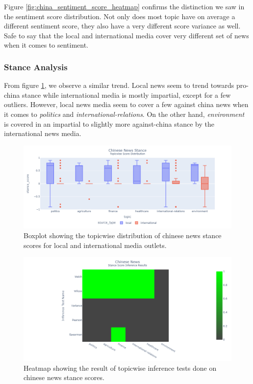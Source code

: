 \documentclass{article}
\theoremstyle{mytheoremstyle}
\theoremstyle{mytheoremstyle}
\theoremstyle{myproblemstyle}
\begin{document}
    Figure \ref{fig:china_sentiment_score_heatmap} confirms the distinction we saw in the sentiment score distribution. Not only does most topic have on average a different sentiment score, they also have a very different score variance as well. Safe to say that the local and international media cover very different set of news when it comes to sentiment.
    
    \subsubsection{Stance Analysis}    

    From figure \ref{fig:china_stance_score_boxplot}, we observe a similar trend. Local news seem to trend towards pro-china stance while international media is mostly impartial, except for a few outliers. However, local news media seem to cover a few against china news when it comes to \emph{politics} and \emph{international-relations}. On the other hand, \emph{environment} is covered in an impartial to slightly more against-china stance by the international news media.
    
    \begin{figure}[hp]
        \centering
        \includegraphics[width=\linewidth]{../images/plots/China/china_boxplot_stance.png}
        \caption{Boxplot showing the topicwise distribution of chinese news stance scores for local and international media outlets.}
        \label{fig:china_stance_score_boxplot}
    \end{figure}

    \begin{figure}[hp]
        \centering
        \includegraphics[width=\linewidth]{../images/plots/China/china_heatmap_inference_stance.png}
        \caption{Heatmap showing the result of topicwise inference tests done on chinese news stance scores.}
        \label{fig:china_stance_score_heatmap}
    \end{figure}
\end{document}
